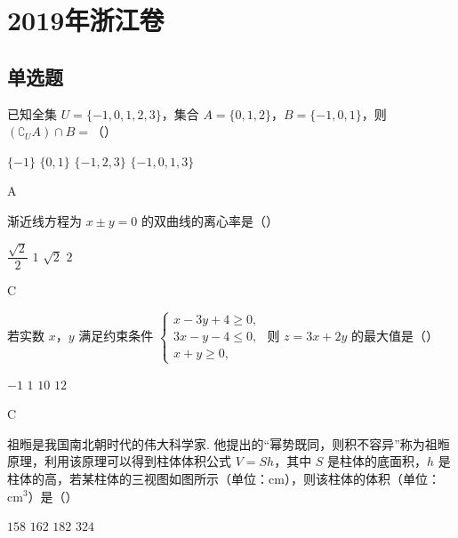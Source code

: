 
\chapter{2019年浙江卷}

\section{单选题}

\begin{problem}
已知全集 \(U=\{-1,0,1,2,3\}\)，集合 \(A=\{0,1,2\}\)，\(B=\{-1,0,1\}\)，则 \(\left(\complement_U A\right)\cap B=\)（\quad）

\choices
    {\(\{-1\}\)}
    {\(\{0,1\}\)}
    {\(\{-1,2,3\}\)}
    {\(\{-1,0,1,3\}\)}
\end{problem}

\begin{answer}
A
\end{answer}

\begin{problem}
渐近线方程为 \(x\pm y=0\) 的双曲线的离心率是（\quad）

\choices
    {\(\dfrac{\sqrt2}{2}\)}
    {\(1\)}
    {\(\sqrt2\)}
    {\(2\)}
\end{problem}

\begin{answer}
C
\end{answer}

\begin{problem}
若实数 \(x\)，\(y\) 满足约束条件 \(\begin{cases}
x-3y+4\ge0,\\
3x-y-4\le0,\\
x+y\ge0,
\end{cases}\) 则 \(z=3x+2y\) 的最大值是（\quad）

\choices
    {\(-1\)}
    {\(1\)}
    {\(10\)}
    {\(12\)}
\end{problem}

\begin{answer}
C
\end{answer}

\begin{problem}
祖暅是我国南北朝时代的伟大科学家. 他提出的“幂势既同，则积不容异”称为祖暅原理，利用该原理可以得到柱体体积公式 \(V=Sh\)，其中 \(S\) 是柱体的底面积，\(h\) 是柱体的高，若某柱体的三视图如图所示（单位：\(\mathrm{cm}\)），则该柱体的体积（单位：\(\mathrm{cm}^3\)）是（\quad）


\choices
    {\(158\)}
    {\(162\)}
    {\(182\)}
    {\(324\)}
\end{problem}

